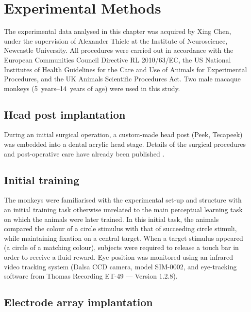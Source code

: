 \section{Experimental Methods}
\label{ch:exp}

The experimental data analysed in this chapter was acquired by Xing Chen, under the supervision of Alexander Thiele at the Institute of Neuroscience, Newcastle University.
All procedures were carried out in accordance with the European Communities Council Directive RL 2010/63/EC, the US National Institutes of Health Guidelines for the Care and Use of Animals for Experimental Procedures, and the UK Animals Scientific Procedures Act. Two male macaque monkeys (\SIrange{5}{14}{years} of age) were used in this study.


\subsection{Head post implantation}

During an initial surgical operation, a custom-made head post (Peek, Tecapeek) was embedded into a dental acrylic head stage.
Details of the surgical procedures and post-operative care have already been published \citep[see][]{Thiele2006}.


\subsection{Initial training}

The monkeys were familiarised with the experimental set-up and structure with an initial training task otherwise unrelated to the main perceptual learning task on which the animals were later trained.
In this initial task, the animals compared the colour of a circle stimulus with that of succeeding circle stimuli, while maintaining fixation on a central target.
When a target stimulus appeared (a circle of a matching colour), subjects were required to release a touch bar in order to receive a fluid reward.
Eye position was monitored using an infrared video tracking system (Dalsa CCD camera, model SIM-0002, and eye-tracking software from Thomas Recording ET-49 --- Version 1.2.8).


\subsection{Electrode array implantation}

